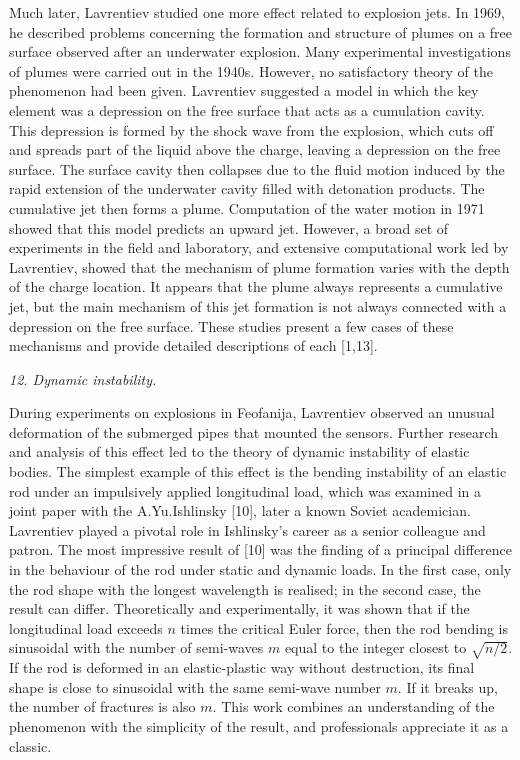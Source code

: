 \documentclass[%
 reprint,
onecolumn,
 amsmath,amssymb, aps,
]{revtex4-2}
\numberwithin{equation}{section}
\begin{document}
Much later, Lavrentiev studied one more effect related to explosion jets.
In 1969, he described problems concerning the formation and structure of plumes on a free surface observed after an underwater explosion.
Many experimental investigations of plumes were carried out in the 1940s.
However, no satisfactory theory of the phenomenon had been given.
Lavrentiev suggested a model in which the key element was a depression on the free surface that acts as a cumulation cavity.
This depression is formed by the shock wave from the explosion, which cuts off and spreads part of the liquid above the charge, leaving a depression on the free surface.
 The surface cavity then collapses due to the fluid motion induced by the rapid extension of the underwater cavity filled with detonation products.
The cumulative jet then forms a plume.
 Computation of the water motion in 1971 showed that this model predicts an upward jet.
However, a broad set of experiments in the field and laboratory, and extensive computational work led by Lavrentiev, showed that the mechanism of plume formation varies with the depth of the charge location.
It appears that the plume always represents a cumulative jet, but the main mechanism of this jet formation is not always connected with a depression on the free surface.
These studies present a few cases of these mechanisms and provide detailed descriptions of each [1,13].
\vspace{3mm}


\textit{12. Dynamic instability.}
\vspace{1mm}

During experiments on explosions in Feofanija, Lavrentiev observed an unusual deformation of the submerged pipes that mounted the sensors.
Further research and analysis of this effect led to the theory of dynamic instability of elastic bodies.
The simplest example of this effect is the bending instability of an elastic rod under an impulsively applied longitudinal load, which was examined in a joint paper with the  A.Yu.Ishlinsky [10], later a known Soviet academician.
Lavrentiev played a pivotal role in Ishlinsky's career as a senior colleague and patron.
The most impressive result of [10] was the finding of a principal difference in the behaviour of the rod under static and dynamic loads.
In the first case, only the rod shape with the longest wavelength is realised; in the second case, the result can differ.
Theoretically and experimentally, it was shown that if the longitudinal load exceeds $n$ times the critical Euler force, then the rod bending is sinusoidal with the number of semi-waves $m$ equal to the integer closest to $\sqrt{n/2}$.
If the rod is deformed in an elastic-plastic way without destruction, its final shape is close to sinusoidal with the same semi-wave number $m$.
If it breaks up, the number of fractures is also $m$.
This work combines an understanding of the phenomenon with the simplicity of the result, and professionals appreciate it as a classic.
\vspace{3mm}
\end{document}
